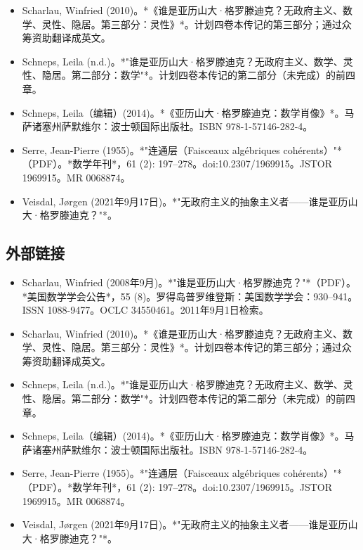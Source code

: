 \begin{itemize}
\item Scharlau, Winfried (2010)。*《谁是亚历山大·格罗滕迪克？无政府主义、数学、灵性、隐居。第三部分：灵性》*。计划四卷本传记的第三部分；通过众筹资助翻译成英文。  
\item Schneps, Leila (n.d.)。*"谁是亚历山大·格罗滕迪克？无政府主义、数学、灵性、隐居。第二部分：数学"*。计划四卷本传记的第二部分（未完成）的前四章。  
\item Schneps, Leila（编辑）(2014)。*《亚历山大·格罗滕迪克：数学肖像》*。马萨诸塞州萨默维尔：波士顿国际出版社。ISBN 978-1-57146-282-4。  
\item Serre, Jean-Pierre (1955)。*"连通层（Faisceaux algébriques cohérents）"*（PDF）。*数学年刊*，61 (2): 197–278。doi:10.2307/1969915。JSTOR 1969915。MR 0068874。  
\item Veisdal, Jørgen (2021年9月17日)。*"无政府主义的抽象主义者——谁是亚历山大·格罗滕迪克？"*。
\end{itemize}
\subsection{外部链接}
\begin{itemize}
\item Scharlau, Winfried (2008年9月)。*"谁是亚历山大·格罗滕迪克？"*（PDF）。*美国数学学会公告*，55 (8)。罗得岛普罗维登斯：美国数学学会：930–941。ISSN 1088-9477。OCLC 34550461。2011年9月1日检索。  
\item Scharlau, Winfried (2010)。*《谁是亚历山大·格罗滕迪克？无政府主义、数学、灵性、隐居。第三部分：灵性》*。计划四卷本传记的第三部分；通过众筹资助翻译成英文。  
\item Schneps, Leila (n.d.)。*"谁是亚历山大·格罗滕迪克？无政府主义、数学、灵性、隐居。第二部分：数学"*。计划四卷本传记的第二部分（未完成）的前四章。  
\item Schneps, Leila（编辑）(2014)。*《亚历山大·格罗滕迪克：数学肖像》*。马萨诸塞州萨默维尔：波士顿国际出版社。ISBN 978-1-57146-282-4。  
\item Serre, Jean-Pierre (1955)。*"连通层（Faisceaux algébriques cohérents）"*（PDF）。*数学年刊*，61 (2): 197–278。doi:10.2307/1969915。JSTOR 1969915。MR 0068874。  
\item Veisdal, Jørgen (2021年9月17日)。*"无政府主义的抽象主义者——谁是亚历山大·格罗滕迪克？"*。
\end{itemize}